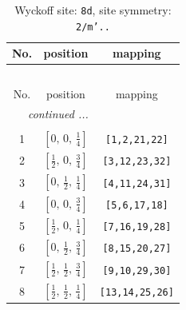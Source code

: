 \documentclass[fleqn,8pt]{jsarticle}
\begin{document}
\begin{longtable}{ccc}
\caption{Wyckoff site: {\tt 8d}, site symmetry: {\tt 2/m'..}}
 \\
 \hline \hline
No. & position & mapping \\ \hline \endfirsthead

\multicolumn{2}{l}{\tablename\ \thetable{}} \\
 \hline \hline
No. & position & mapping \\ \hline \endhead

 \hline \hline
\multicolumn{2}{r}{\footnotesize\it continued ...} \\ \endfoot

 \hline \hline
\multicolumn{2}{r}{} \\ \endlastfoot

1 & $\left[ 0,\, 0,\, \frac{1}{4} \right]$ & {\tt [1,2,21,22]} \\ \hline
2 & $\left[ \frac{1}{2},\, 0,\, \frac{3}{4} \right]$ & {\tt [3,12,23,32]} \\ \hline
3 & $\left[ 0,\, \frac{1}{2},\, \frac{1}{4} \right]$ & {\tt [4,11,24,31]} \\ \hline
4 & $\left[ 0,\, 0,\, \frac{3}{4} \right]$ & {\tt [5,6,17,18]} \\ \hline
5 & $\left[ \frac{1}{2},\, 0,\, \frac{1}{4} \right]$ & {\tt [7,16,19,28]} \\ \hline
6 & $\left[ 0,\, \frac{1}{2},\, \frac{3}{4} \right]$ & {\tt [8,15,20,27]} \\ \hline
7 & $\left[ \frac{1}{2},\, \frac{1}{2},\, \frac{3}{4} \right]$ & {\tt [9,10,29,30]} \\ \hline
8 & $\left[ \frac{1}{2},\, \frac{1}{2},\, \frac{1}{4} \right]$ & {\tt [13,14,25,26]} \\
\end{longtable}
\renewcommand{\arraystretch}{1.2}
\end{document}
